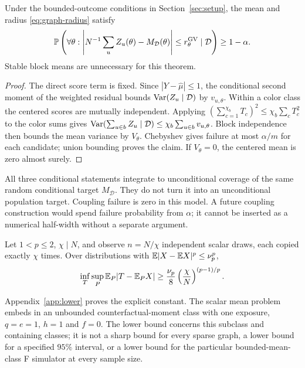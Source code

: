 \begin{theorem}
\label{thm:graph-variance}
Under the bounded-outcome conditions in Section~\ref{sec:setup}, the mean and radius \eqref{eq:graph-radius} satisfy
\[
 \mathbb{P}\left(\forall\theta:\left|N^{-1}\sum_uZ_u(\theta)-M_{\mathcal D}(\theta)\right|
 \le r_\theta^{\rm GV}\mid\mathcal D\right)\ge1-\alpha.
\]
Stable block means are unnecessary for this theorem.
\end{theorem}
\begin{proof}
The direct score term is fixed. Since $|Y-\widehat\mu|\le1$, the conditional second moment of the weighted residual bounds $\operatorname{Var}(Z_u\mid\mathcal D)$ by $v_{u,\theta}$. Within a color class the centered scores are mutually independent. Applying $(\sum_{c=1}^{\chi_b}T_c)^2\le\chi_b\sum_cT_c^2$ to the color sums gives $\operatorname{Var}(\sum_{u\in b}Z_u\mid\mathcal D)\le\chi_b\sum_{u\in b}v_{u,\theta}$. Block independence then bounds the mean variance by $V_\theta$. Chebyshev gives failure at most $\alpha/m$ for each candidate; union bounding proves the claim. If $V_\theta=0$, the centered mean is zero almost surely.
\end{proof}
All three conditional statements integrate to unconditional coverage of the same random conditional target $M_{\mathcal D}$. They do not turn it into an unconditional population target. Coupling failure is zero in this model. A future coupling construction would spend failure probability from $\alpha$; it cannot be inserted as a numerical half-width without a separate argument.

\begin{theorem}
\label{thm:lower}
Let $1<p\le2$, $\chi\mid N$, and observe $n=N/\chi$ independent scalar draws, each copied exactly $\chi$ times. Over distributions with $\mathbb{E}|X-\mathbb{E} X|^p\le\nu_p^p$,
\[
 \inf_T\sup_P\mathbb{E}_P|T-\mathbb{E}_PX|\ge\frac{\nu_p}{8}
 \left(\frac\chi N\right)^{(p-1)/p}.
\]
\end{theorem}
Appendix~\ref{app:lower} proves the explicit constant. The scalar mean problem embeds in an unbounded counterfactual-moment class with one exposure, $q=e=1$, $h=1$ and $f=0$. The lower bound concerns this subclass and containing classes; it is not a sharp bound for every sparse graph, a lower bound for a specified $95\%$ interval, or a lower bound for the particular bounded-mean-class F simulator at every sample size.
